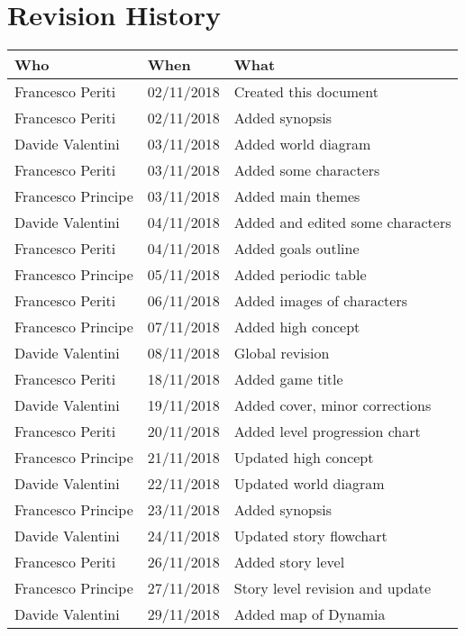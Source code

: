 \chapter*{Revision History}

\begin{longtable}[H]{|l|l|l|}
\hline
\cellcolor{lightgray}\textbf{Who} & \cellcolor{lightgray}\textbf{When} & \cellcolor{lightgray}\textbf{What} \\ \hline
Francesco Periti & 02/11/2018 & Created this document \\ \hline
Francesco Periti & 02/11/2018 & Added synopsis \\ \hline
Davide Valentini & 03/11/2018 & Added world diagram \\ \hline
Francesco Periti & 03/11/2018 & Added some characters \\ \hline
Francesco Principe & 03/11/2018 & Added main themes \\ \hline
Davide Valentini & 04/11/2018 & Added and edited some characters \\ \hline
Francesco Periti & 04/11/2018 & Added goals outline \\ \hline
Francesco Principe & 05/11/2018 & Added periodic table \\ \hline
Francesco Periti & 06/11/2018 & Added images of characters \\ \hline
Francesco Principe & 07/11/2018 & Added high concept \\ \hline
Davide Valentini & 08/11/2018 & Global revision \\ \hline
Francesco Periti & 18/11/2018 & Added game title \\ \hline
Davide Valentini & 19/11/2018 & Added cover, minor corrections \\ \hline
Francesco Periti & 20/11/2018 & Added level progression chart \\ \hline
Francesco Principe & 21/11/2018 & Updated high concept \\ \hline
Davide Valentini & 22/11/2018 & Updated world diagram \\ \hline
Francesco Principe & 23/11/2018 & Added synopsis \\ \hline
Davide Valentini & 24/11/2018 & Updated story flowchart \\ \hline
Francesco Periti & 26/11/2018 & Added story level \\ \hline
Francesco Principe & 27/11/2018 & Story level revision and update \\ \hline
Davide Valentini & 29/11/2018 & Added map of Dynamia \\ \hline

\end{longtable}
